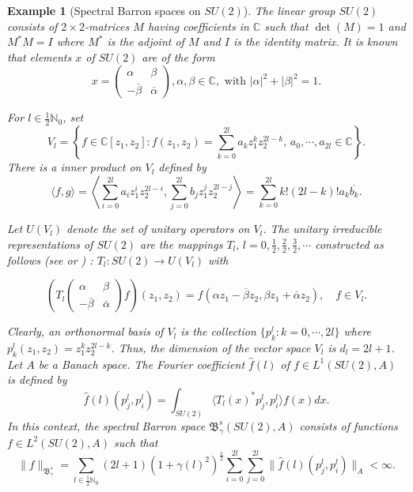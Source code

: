 \documentclass[12pt]{amsart}%
\newtheorem{example}[theorem]{Example}
\begin{document}
\begin{example}[Spectral Barron spaces on $SU(2)$] {\rm
The linear group $SU(2)$ consists of $2\times 2$-matrices $M$ having coefficients in $\mathbb{C}$ such that $\det (M)=1$ and $M^*M=I$ where $M^*$ is the adjoint of $M$ and $I$ is the identity matrix. It is known that elements  $x$ of $SU(2)$ are   of the form 
\begin{equation}
x=\left(\begin{array}{cc}
\alpha & \beta \\ 
-\overline{\beta} & \overline{\alpha}
\end{array} \right), \alpha,\beta \in \mathbb{C}, \mbox{ with } |\alpha|^2+|\beta|^2=1.
\end{equation}

For $l\in \frac{1}{2}\mathbb{N}_0$, set 
$$V_l=\left\{f\in \mathbb{C}[z_1,z_2] : f(z_1,z_2)=\sum\limits_{k=0}^{2l}a_kz_1^kz_2^{2l-k},\, a_0, \cdots, a_{2l}\in \mathbb{C} \right\}.$$
There is a inner product on $V_l$ defined by 
\begin{equation}
\langle f,g\rangle=\left\langle\sum\limits_{i=0}^{2l}a_iz_1^iz_2^{2l-i}, \sum\limits_{j=0}^{2l}b_jz_1^jz_2^{2l-j} \right\rangle=\sum\limits_{k=0}^{2l}k!(2l-k)!a_k\overline{b_k}.
\end{equation}

Let $U(V_l)$ denote the set of unitary operators on $V_l$. 
The unitary irreducible representations of $SU(2)$ are the mappings $T_l,\, l=0,\frac{1}{2},\frac{2}{2}, \frac{3}{2},  \cdots$ constructed as follows (see \cite{Dooley} or \cite[Chapter 11]{Ruzhansky}) :
$T_l : SU(2)\rightarrow  U(V_l)$ with 

\begin{equation}
\left(T_l\left(\begin{array}{cc}
\alpha & \beta \\ 
-\overline{\beta} & \overline{\alpha}
\end{array} \right)f\right)(z_1,z_2)=f(\alpha z_1-\overline{\beta}z_2,\beta z_1+\overline{\alpha}z_2),\quad f\in V_l.
\end{equation} 



Clearly, an  orthonormal basis  of $V_l$ is the collection $\{p_k^l : k=0,\cdots, 2l\}$ where
$p_k^l(z_1,z_2)=z_1^kz_2^{2l-k}$. 
Thus, the  dimension of the vector space $V_l$ is $d_l=2l+1$. Let $A$ be a Banach space. 
The Fourier coefficient $\widehat{f}(l)$ of $f\in L^1(SU(2), A)$ is defined  by 
$$\widehat{f}(l)(p_{j}^l,p_{i}^l)=\int_{SU(2)}\langle T_l(x)^*p_{j}^l,p_{i}^l\rangle f(x) dx.$$
In this context, the spectral Barron space $\mathfrak{B}^s_\gamma(SU(2),A)$ consists of functions $f\in L^2( SU(2),A)$ such that
$$\|f\|_{\mathfrak{B}^s_\gamma}=\sum\limits_{l\in \frac{1}{2}\mathbb{N}_0}(2l+1)(1+\gamma (l)^2)^{\frac{s}{2}}\sum\limits_{i=0}^{2l}\sum\limits_{j=0}^{2l}\|\widehat{f}(l)(p_{j}^l, p_{i}^l)\|_A<\infty.$$ 
}\end{example}
\end{document}
